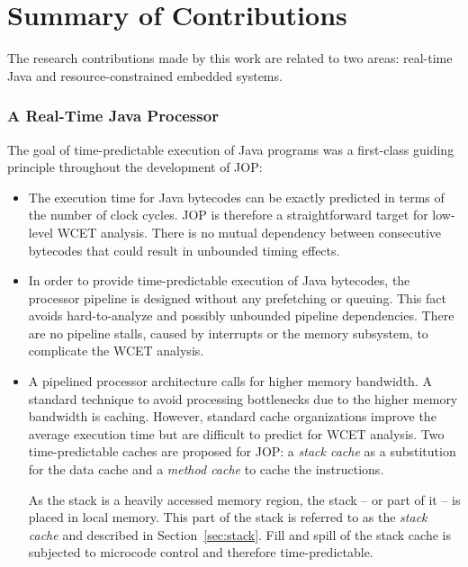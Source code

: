 \section{Summary of Contributions}

The research contributions made by this work are related to two
areas: real-time Java and resource-constrained embedded systems.

\subsubsection{A Real-Time Java Processor}

The goal of time-predictable execution of Java programs was a
first-class guiding principle throughout the development of JOP:

\begin{itemize}

        \item
The execution time for Java bytecodes can be exactly predicted in
terms of the number of clock cycles.
JOP is therefore a straightforward target for low-level WCET
analysis. There is no mutual dependency between consecutive
bytecodes that could result in unbounded timing effects.

    \item
In order to provide time-predictable execution of Java bytecodes,
the processor pipeline is designed without any prefetching or
queuing. This fact avoids hard-to-analyze and possibly unbounded
pipeline dependencies. There are no pipeline stalls, caused by
interrupts or the memory subsystem, to complicate the WCET analysis.

    \item
A pipelined processor architecture calls for higher memory
bandwidth. A standard technique to avoid processing bottlenecks due
to the higher memory bandwidth is caching.
However, standard cache organizations improve the average execution
time but are difficult to predict for WCET analysis. Two
time-predictable caches are proposed for JOP: a \emph{stack cache}
as a substitution for the data cache and a \emph{method cache} to
cache the instructions.

As the stack is a heavily accessed memory region, the stack -- or
part of it -- is placed in local memory. This part of the stack is
referred to as the \emph{stack cache} and described in
Section~\ref{sec:stack}. Fill and spill of the stack cache is
subjected to microcode control and therefore time-predictable.


\end{itemize}
